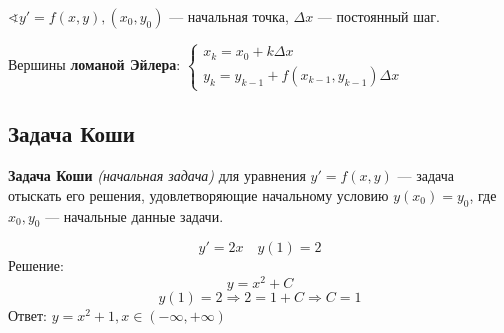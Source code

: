 \begin{definition}
    $\sphericalangle y'=f(x, y), (x_0, y_0)$ --- начальная точка, $\Delta x$ --- постоянный шаг.

    Вершины \textbf{ломаной Эйлера}: $\begin{cases}
            x_k = x_0 + k\Delta x \\
            y_k = y_{k-1} + f(x_{k-1}, y_{k-1})\Delta x
        \end{cases}$
\end{definition}

\subsection{Задача Коши}

\begin{definition}
    \textbf{Задача Коши} \textit{(начальная задача)} для уравнения $y'=f(x, y)$ --- задача отыскать его решения, удовлетворяющие начальному условию $y(x_0)=y_0$, где $x_0, y_0$ --- начальные данные задачи.
\end{definition}

\begin{example}
    $$y'=2x \quad y(1)=2$$
    Решение:
    $$y=x^2+C$$
    $$y(1)=2 \Rightarrow 2 = 1 + C \Rightarrow C = 1$$
    Ответ: $y=x^2+1, x\in(-\infty, +\infty)$
\end{example}

